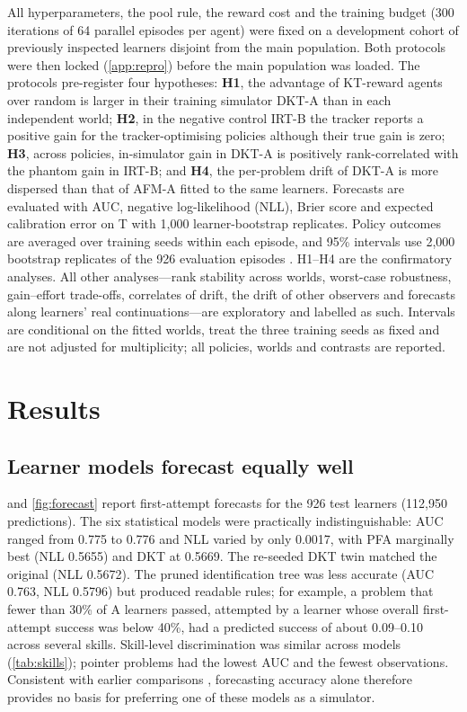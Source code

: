 \documentclass[a4paper,preprint,12pt,authoryear]{elsarticle}
\begin{document}
All hyperparameters, the pool rule, the reward cost and the training budget (300 iterations of 64 parallel episodes per agent) were fixed on a development cohort of previously inspected learners disjoint from the main population. Both protocols were then locked (\ref{app:repro}) before the main population was loaded. The protocols pre-register four hypotheses: \textbf{H1}, the advantage of KT-reward agents over random is larger in their training simulator DKT-A than in each independent world; \textbf{H2}, in the negative control IRT-B the tracker reports a positive gain for the tracker-optimising policies although their true gain is zero; \textbf{H3}, across policies, in-simulator gain in DKT-A is positively rank-correlated with the phantom gain in IRT-B; and \textbf{H4}, the per-problem drift of DKT-A is more dispersed than that of AFM-A fitted to the same learners. Forecasts are evaluated with AUC, negative log-likelihood (NLL), Brier score and expected calibration error on T with 1,000 learner-bootstrap replicates. Policy outcomes are averaged over training seeds within each episode, and 95\% intervals use 2,000 bootstrap replicates of the 926 evaluation episodes \citep{efron1993bootstrap}. H1--H4 are the confirmatory analyses. All other analyses---rank stability across worlds, worst-case robustness, gain--effort trade-offs, correlates of drift, the drift of other observers and forecasts along learners' real continuations---are exploratory and labelled as such. Intervals are conditional on the fitted worlds, treat the three training seeds as fixed and are not adjusted for multiplicity; all policies, worlds and contrasts are reported.

\section{Results}\label{sec:results}

\subsection{Learner models forecast equally well}\label{sec:res-forecast}

 and \cref{fig:forecast} report first-attempt forecasts for the 926 test learners (112,950 predictions). The six statistical models were practically indistinguishable: AUC ranged from 0.775 to 0.776 and NLL varied by only 0.0017, with PFA marginally best (NLL 0.5655) and DKT at 0.5669. The re-seeded DKT twin matched the original (NLL 0.5672). The pruned identification tree was less accurate (AUC 0.763, NLL 0.5796) but produced readable rules; for example, a problem that fewer than 30\% of A learners passed, attempted by a learner whose overall first-attempt success was below 40\%, had a predicted success of about 0.09--0.10 across several skills. Skill-level discrimination was similar across models (\cref{tab:skills}); pointer problems had the lowest AUC and the fewest observations. Consistent with earlier comparisons \citep{khajah2016deep,wilson2016basics,gervet2020deep}, forecasting accuracy alone therefore provides no basis for preferring one of these models as a simulator.
\end{document}
